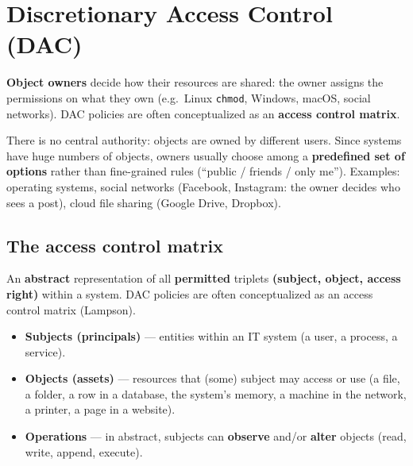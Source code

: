 \section{Discretionary Access Control (DAC)}

\begin{defnbox}[title=Discretionary Access Control (DAC)]
\textbf{Object owners} decide how their resources are shared: the owner assigns the
permissions on what they own (e.g.\ Linux \texttt{chmod}, Windows, macOS, social
networks). DAC policies are often conceptualized as an \textbf{access control matrix}.
\end{defnbox}

\begin{rembox}[title=DAC in practice]
There is no central authority: objects are owned by different users. Since systems have huge
numbers of objects, owners usually choose among a \textbf{predefined set of options} rather than
fine-grained rules (``public / friends / only me''). Examples: operating systems, social networks
(Facebook, Instagram: the owner decides who sees a post), cloud file sharing (Google Drive,
Dropbox).
\end{rembox}

\subsection{The access control matrix}

\begin{defnbox}[title=Access control matrix]
An \textbf{abstract} representation of all \textbf{permitted} triplets
\textbf{(subject, object, access right)} within a system. DAC policies are often
conceptualized as an access control matrix (Lampson).
\begin{itemize}
  \item \textbf{Subjects (principals)} --- entities within an IT system (a user, a
        process, a service).
  \item \textbf{Objects (assets)} --- resources that (some) subject may access or use
        (a file, a folder, a row in a database, the system's memory, a machine in the
        network, a printer, a page in a website).
  \item \textbf{Operations} --- in abstract, subjects can \textbf{observe} and/or
        \textbf{alter} objects (read, write, append, execute).
\end{itemize}
\end{defnbox}

